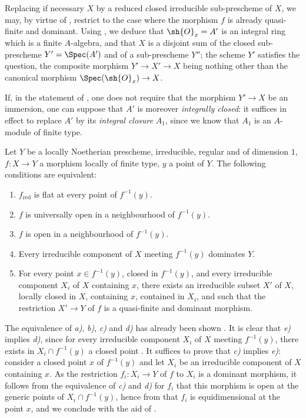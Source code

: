 Replacing if necessary $X$ by a reduced closed irreducible sub-prescheme of $X$, we may, by virtue of , restrict to the case where the morphism $f$ is already quasi-finite and dominant.
Using , we deduce that $\sh{O}_x=A'$ is an integral ring which is a finite $A$-algebra, and that $X$ is a disjoint sum of the closed sub-prescheme $Y'=\Spec(A')$ and of a sub-prescheme $Y''$; the scheme $Y'$ satisfies the question, the composite morphism $Y'\to X'\to X$ being nothing other than the canonical morphism $\Spec(\sh{O}_x)\to X$.

\begin{remark}[14.5.5]
\label{IV.14.5.5}
If, in the statement of , one does not require that the morphism $Y'\to X$ be an immersion, one can suppose that $A'$ is moreover \emph{integrally closed}: it suffices in effect to replace $A'$ by its \emph{integral closure} $A_1$, since we know  that $A_1$ is an $A$-module of finite type.
\end{remark}

\begin{proposition}[14.5.6]
\label{IV.14.5.6}
Let $Y$ be a locally Noetherian prescheme, irreducible, regular and of dimension $1$, $f:X\to Y$ a morphism locally of finite type, $y$ a point of $Y$.
The following conditions are equivalent:
\begin{enumerate}[label=\emph{\alph*)}]
  \item $f_{\mathrm{red}}$ is flat at every point of $f^{-1}(y)$.
  \item $f$ is universally open in a neighbourhood of $f^{-1}(y)$.
  \item $f$ is open in a neighbourhood of $f^{-1}(y)$.
  \item Every irreducible component of $X$ meeting $f^{-1}(y)$ dominates $Y$.
  \item For every point $x\in f^{-1}(y)$, closed in $f^{-1}(y)$, and every irreducible component $X_i$ of $X$ containing $x$, there exists an irreducible subset $X'$ of $X$, locally closed in $X$, containing $x$, contained in $X_i$, and such that the restriction $X'\to Y$ of $f$ is a quasi-finite and dominant morphism.
\end{enumerate}
\end{proposition}

The equivalence of \emph{a)}, \emph{b)}, \emph{c)} and \emph{d)} has already been shown .
It is clear that \emph{e)} implies \emph{d)}, since for every irreducible component $X_i$ of $X$ meeting $f^{-1}(y)$, there exists in $X_i\cap f^{-1}(y)$ a closed point .
It suffices to prove that \emph{c)} implies \emph{e)}: consider a closed point $x$ of $f^{-1}(y)$ and let $X_i$ be an irreducible component of $X$ containing $x$.
As the restriction $f_i:X_i\to Y$ of $f$ to $X_i$ is a dominant morphism, it follows from the equivalence of \emph{c)} and \emph{d)} for $f_i$ that this morphism is open at the generic points of $X_i\cap f^{-1}(y)$, hence from  that $f_i$ is equidimensional at the point $x$, and we conclude with the aid of .

